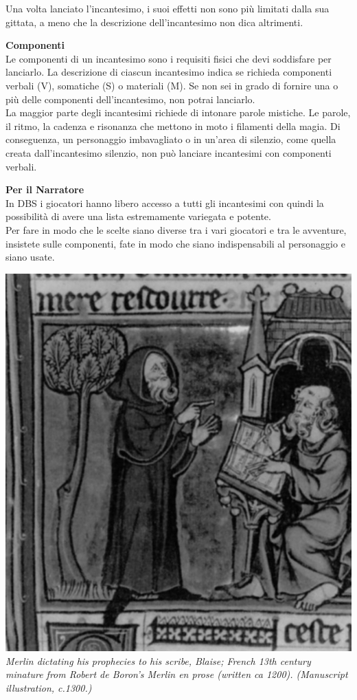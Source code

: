 \begin{multicols}{2}
Una volta lanciato l'incantesimo, i suoi effetti non sono più limitati dalla sua gittata, a meno che la descrizione dell'incantesimo non dica altrimenti.\\

\medskip

\textbf{Componenti}\\
Le componenti di un incantesimo sono i requisiti fisici che devi soddisfare per lanciarlo. La descrizione di ciascun incantesimo indica se richieda componenti verbali (V), somatiche (S) o materiali (M). Se non sei in grado di fornire una o più delle componenti dell'incantesimo, non potrai lanciarlo.\\
La maggior parte degli incantesimi richiede di intonare parole mistiche. Le parole, il ritmo, la cadenza e risonanza che mettono in moto i filamenti della magia. Di conseguenza, un personaggio imbavagliato o in un'area di silenzio, come quella creata dall'incantesimo silenzio, non può lanciare incantesimi con componenti verbali.\\

\begin{note}\textbf{Per il Narratore}\\
In DBS i giocatori hanno libero accesso a tutti gli incantesimi con quindi la possibilità di avere una lista estremamente variegata e potente.\\
Per fare in modo che le scelte siano diverse tra i vari giocatori e tra le avventure, insistete sulle componenti, fate in modo che siano indispensabili al personaggio e siano usate.
\end{note}

\begin{center}
	\includegraphics[width=0.9\linewidth]{immagini/merlin.png}
	\textit{Merlin dictating his prophecies to his scribe, Blaise; French 13th century minature from Robert de Boron's Merlin en prose (written ca 1200). (Manuscript illustration, c.1300.)}
\end{center}


\end{multicols}
